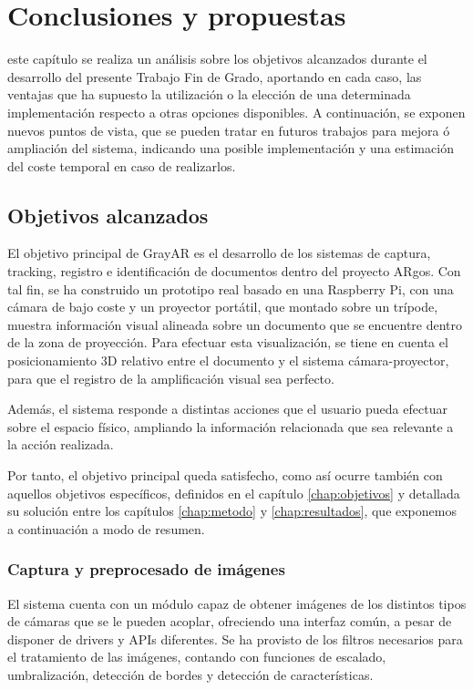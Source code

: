 \chapter{Conclusiones y propuestas}
\label{chap:conclusiones}
 este capítulo se realiza un análisis sobre los objetivos alcanzados durante el desarrollo del presente Trabajo Fin de Grado, aportando en cada caso, las ventajas que ha supuesto la utilización o la elección de una determinada implementación respecto a otras opciones disponibles. A continuación, se exponen nuevos puntos de vista, que se pueden tratar en futuros trabajos para mejora ó ampliación del sistema, indicando una posible implementación y una estimación del coste temporal en caso de realizarlos. 

\section{Objetivos alcanzados}

El objetivo principal de GrayAR es el desarrollo de los sistemas de captura, tracking, registro e identificación de documentos dentro del proyecto ARgos. Con tal fin, se ha construido un prototipo real basado en una Raspberry Pi, con una cámara de bajo coste y un proyector portátil, que montado sobre un trípode, muestra información visual alineada sobre un documento que se encuentre dentro de la zona de proyección. Para efectuar esta visualización, se tiene en cuenta el posicionamiento 3D relativo entre el documento y el sistema cámara-proyector, para que el registro de la amplificación visual sea perfecto.

Además, el sistema responde a distintas acciones que el usuario pueda efectuar sobre el espacio físico, ampliando la información relacionada que sea relevante a la acción realizada.

Por tanto, el objetivo principal queda satisfecho, como así ocurre también con aquellos objetivos específicos, definidos en el capítulo \ref{chap:objetivos} y detallada su solución entre los capítulos \ref{chap:metodo} y  \ref{chap:resultados}, que exponemos a continuación a modo de resumen.   

\subsection{Captura y preprocesado de imágenes}
El sistema cuenta con un módulo capaz de obtener imágenes de los distintos tipos de cámaras que se le pueden acoplar, ofreciendo una interfaz común, a pesar de disponer de drivers y APIs diferentes. Se ha provisto de los filtros necesarios para el tratamiento de las imágenes, contando con funciones de escalado, umbralización, detección de bordes y detección de características.

